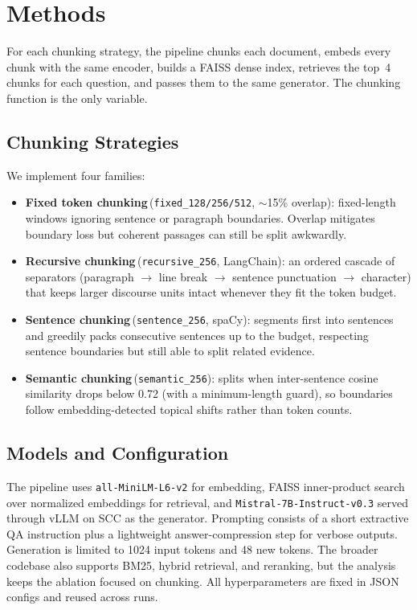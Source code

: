 \documentclass[11pt]{article}
\begin{document}
\section{Methods}

For each chunking strategy, the pipeline chunks each document, embeds every chunk with
the same encoder, builds a FAISS dense index, retrieves the top~4 chunks for each
question, and passes them to the same generator. The chunking function is the only
variable.

\subsection{Chunking Strategies}

We implement four families:
\begin{itemize}
  \item \textbf{Fixed token chunking}\,(\texttt{fixed\_128/256/512}, $\sim$15\% overlap):
    fixed-length windows ignoring sentence or paragraph boundaries. Overlap mitigates
    boundary loss but coherent passages can still be split awkwardly.
  \item \textbf{Recursive chunking}\,(\texttt{recursive\_256}, LangChain): an ordered
    cascade of separators (paragraph $\rightarrow$ line break $\rightarrow$ sentence
    punctuation $\rightarrow$ character) that keeps larger discourse units intact
    whenever they fit the token budget.
  \item \textbf{Sentence chunking}\,(\texttt{sentence\_256}, spaCy): segments first into
    sentences and greedily packs consecutive sentences up to the budget, respecting
    sentence boundaries but still able to split related evidence.
  \item \textbf{Semantic chunking}\,(\texttt{semantic\_256}): splits when inter-sentence
    cosine similarity drops below 0.72 (with a minimum-length guard), so boundaries
    follow embedding-detected topical shifts rather than token counts.
\end{itemize}

\subsection{Models and Configuration}

The pipeline uses \texttt{all-MiniLM-L6-v2} for embedding, FAISS inner-product search
over normalized embeddings for retrieval, and \texttt{Mistral-7B-Instruct-v0.3} served
through vLLM on SCC as the generator. Prompting consists of a short extractive QA
instruction plus a lightweight answer-compression step for verbose outputs. Generation
is limited to 1024 input tokens and 48 new tokens. The broader codebase also supports
BM25, hybrid retrieval, and reranking, but the analysis keeps the ablation focused on
chunking. All hyperparameters are fixed in JSON configs and reused across runs.
\end{document}
